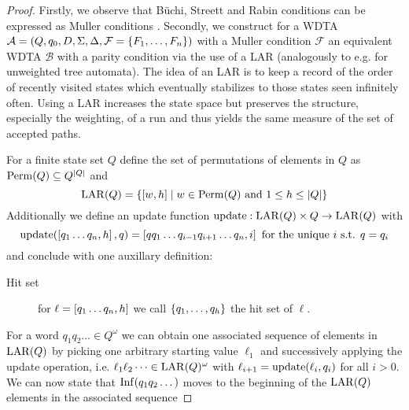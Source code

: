 \begin{proof}
  Firstly, we observe that Büchi, Streett and Rabin conditions can be expressed
  as Muller conditions \cite[Proposition 5.3]{LangAutoLog}. Secondly, we
  construct for a \ac{WDTA} $\mathcal{A} = \left(Q, q_{0}, D, \Sigma, \Delta,
  \mathcal{F} = \left\{F_{1},\dots,F_{n}\right\}\right)$ with a Muller condition $\mathcal{F}$
  an equivalent \ac{WDTA} $\mathcal{B}$ with a parity condition via the use of
  a \ac{LAR} (analogously to e.g. \cite{MullerSchupp} for unweighted tree
  automata). The idea of an \ac{LAR} is to keep a record of the order of
  recently visited states which eventually stabilizes to those states seen
  infinitely often. Using a \ac{LAR} increases the state space but preserves
  the structure, especially the weighting, of a run and thus yields the same
  measure of the set of accepted paths. 
  \begin{definition}
    For a finite state set $Q$ define the set of permutations of elements in
    $Q$ as $\operatorname{Perm}(Q)\subseteq Q^{\left\vert{Q}\right\vert}$ and
    \begin{equation*}
      \operatorname{LAR}(Q) = \left\{\left[w,h\right]\mid w\in\operatorname{Perm}(Q)\text{ and }1\leq
      h\leq\left\vert{Q}\right\vert\right\}
    \end{equation*}
    Additionally we define an update function
    $\operatorname{update}:\operatorname{LAR}(Q)\times Q\rightarrow\operatorname{LAR}(Q)$ with
    \begin{equation*}
      \operatorname{update}(\left[q_{1}\dots q_{n},h\right], q)
      = \left[qq_{1}\dots q_{i-1}q_{i+1}\dots q_{n},i\right]
      \text{ for the unique }i\text{ s.t. }q=q_{i}
    \end{equation*}
    and conclude with one auxillary definition:
    \begin{description}
      \item [Hit set] for $\ell = \left[q_{1}\dots q_{n},h\right]$ we call
        $\left\{q_{1},\dots,q_{h}\right\}$ the hit set of $\ell$.
    \end{description}
  \end{definition}
  For a word $q_{1}q_{2}\dots\in Q^{\omega}$ we can obtain one associated
  sequence of elements in $\operatorname{LAR}(Q)$ by picking one arbitrary starting value
  $\ell_{1}$ and successively applying the update operation, i.e.
  $\ell_{1}\ell_{2}\dots\in\operatorname{LAR}(Q)^{\omega}$ with
  $\ell_{i+1} = \operatorname{update}(\ell_{i},q_{i})$ for all $i>0$. We can now state that
  $\operatorname{Inf}(q_{1}q_{2}\dots)$ moves to the beginning of the $\operatorname{LAR}(Q)$ elements in
  the associated sequence

\end{proof}
